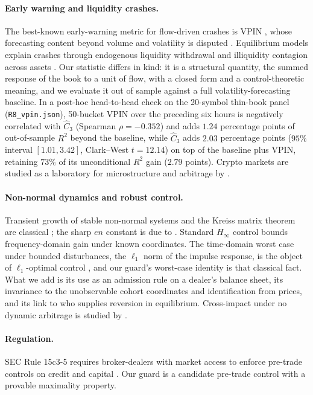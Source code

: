 \documentclass[12pt]{article}
\theoremstyle{definition}
\theoremstyle{remark}
\begin{document}
\paragraph{Early warning and liquidity crashes.} The best-known early-warning metric for flow-driven crashes is VPIN \citep{easley2012}, whose forecasting content beyond volume and volatility is disputed \citep{andersen2014}. Equilibrium models explain crashes through endogenous liquidity withdrawal \citep{huang2009} and illiquidity contagion across assets \citep{cespa2014}. Our statistic differs in kind: it is a structural quantity, the summed response of the book to a unit of flow, with a closed form and a control-theoretic meaning, and we evaluate it out of sample against a full volatility-forecasting baseline. In a post-hoc head-to-head check on the 20-symbol thin-book panel (\texttt{R8\_vpin.json}), 50-bucket VPIN over the preceding six hours is negatively correlated with $\hat C_3$ (Spearman $\rho=-0.352$) and adds $1.24$ percentage points of out-of-sample $R^2$ beyond the baseline, while $\hat C_3$ adds $2.03$ percentage points ($95\%$ interval $[1.01,3.42]$, Clark--West $t=12.14$) on top of the baseline plus VPIN, retaining $73\%$ of its unconditional $R^2$ gain ($2.79$ points). Crypto markets are studied as a laboratory for microstructure and arbitrage by \citet{makarov2020}.

\paragraph{Non-normal dynamics and robust control.} Transient growth of stable non-normal systems and the Kreiss matrix theorem are classical \citep{trefethen2005,kreiss1962}; the sharp $en$ constant is due to \citet{spijker1991}. Standard $H_\infty$ control bounds frequency-domain gain under known coordinates. The time-domain worst case under bounded disturbances, the $\ell_1$ norm of the impulse response, is the object of $\ell_1$-optimal control \citep{vidyasagar1986,dahleh1987,dahleh1995}, and our guard's worst-case identity is that classical fact. What we add is its use as an admission rule on a dealer's balance sheet, its invariance to the unobservable cohort coordinates and identification from prices, and its link to who supplies reversion in equilibrium. Cross-impact under no dynamic arbitrage is studied by \citet{schneider2019}.

\paragraph{Regulation.} SEC Rule 15c3-5 requires broker-dealers with market access to enforce pre-trade controls on credit and capital \citep{sec2010}. Our guard is a candidate pre-trade control with a provable maximality property.
\end{document}

